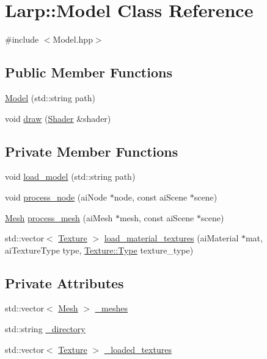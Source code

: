 \hypertarget{classLarp_1_1Model}{}\section{Larp\+:\+:Model Class Reference}
\label{classLarp_1_1Model}


{\ttfamily \#include $<$Model.\+hpp$>$}

\subsection*{Public Member Functions}
\begin{DoxyCompactItemize}
\item 
\hyperlink{classLarp_1_1Model_aa6ec73e894b7d2388bfd0c08bfada774}{Model} (std\+::string path)
\item 
void \hyperlink{classLarp_1_1Model_a042ea3bc2add2d3bbe4f199d070a9619}{draw} (\hyperlink{classLarp_1_1Shader}{Shader} \&shader)
\end{DoxyCompactItemize}
\subsection*{Private Member Functions}
\begin{DoxyCompactItemize}
\item 
void \hyperlink{classLarp_1_1Model_a5c28074e770e1826496458b82651fefd}{load\+\_\+model} (std\+::string path)
\item 
void \hyperlink{classLarp_1_1Model_ad5005f3aa6b553cbcdb9b50cc771ff28}{process\+\_\+node} (ai\+Node $\ast$node, const ai\+Scene $\ast$scene)
\item 
\hyperlink{classLarp_1_1Mesh}{Mesh} \hyperlink{classLarp_1_1Model_a4179a0a55a8a422d6bd1a7f6083a70d4}{process\+\_\+mesh} (ai\+Mesh $\ast$mesh, const ai\+Scene $\ast$scene)
\item 
std\+::vector$<$ \hyperlink{classLarp_1_1Texture}{Texture} $>$ \hyperlink{classLarp_1_1Model_a732230e84175c2e471309bb9b7e08f31}{load\+\_\+material\+\_\+textures} (ai\+Material $\ast$mat, ai\+Texture\+Type type, \hyperlink{classLarp_1_1Texture_aa4e19b5df6a8f1f0eae8235db7e52daa}{Texture\+::\+Type} texture\+\_\+type)
\end{DoxyCompactItemize}
\subsection*{Private Attributes}
\begin{DoxyCompactItemize}
\item 
std\+::vector$<$ \hyperlink{classLarp_1_1Mesh}{Mesh} $>$ \hyperlink{classLarp_1_1Model_ae75758feb59857f6b907bbfa0cf993f2}{\+\_\+meshes}
\item 
std\+::string \hyperlink{classLarp_1_1Model_a568e7aeee510320b2378a0fc57c5c7c5}{\+\_\+directory}
\item 
std\+::vector$<$ \hyperlink{classLarp_1_1Texture}{Texture} $>$ \hyperlink{classLarp_1_1Model_ac5e40faa76039650ae6b32828b8681f9}{\+\_\+loaded\+\_\+textures}
\end{DoxyCompactItemize}


